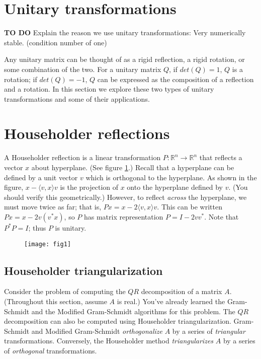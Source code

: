 \label{Ch:Canonical Transformations}


\section*{Unitary transformations}
{\bf TO DO} Explain the reason we use unitary transformations: Very numerically stable. (condition number of one)

Any unitary matrix can be thought of as a rigid reflection, a rigid rotation, or some combination of the two. For a unitary matrix $Q$, if $det(Q) = 1$, $Q$ is a rotation; if $det(Q) = -1$, $Q$ can be expressed as the composition of a reflection and a rotation.  In this section we explore these two types of unitary transformations and some of their applications.

\section*{Householder reflections}
A Householder reflection is a linear transformation $P: \mathbb{R}^n \rightarrow \mathbb{R}^n$ that reflects a vector $x$ about hyperplane. (See figure \ref{fig:Householder reflector}.) Recall that a hyperplane can be defined by a unit vector $v$ which is orthogonal to the hyperplane. As shown in the figure, $x - \langle v,x \rangle v$ is the projection of $x$ onto the hyperplane defined by $v$. (You should verify this geometrically.) However, to reflect \emph{across} the hyperplane, we must move twice as far; that is, $Px = x - 2\langle v,x \rangle v$. This can be written $Px = x - 2v(v^\ast x)$, so $P$ has matrix representation $P = I - 2vv^\ast$. Note that $P^\ast P = I$; thus $P$ is unitary.

\begin{figure}
\label{fig:Householder reflector}
	\texttt{[image: fig1]}
\end{figure}

\subsection*{Householder triangularization}
Consider the problem of computing the $QR$ decomposition of a matrix $A$. (Throughout this section, assume $A$ is real.) You've already learned the Gram-Schmidt and the Modified Gram-Schmidt algorithms for this problem. The $QR$ decomposition can also be computed using Householder triangularization. Gram-Schmidt and Modified Gram-Schmidt \emph{orthogonalize} $A$ by a series of \emph{triangular} transformations. Conversely, the Householder method \emph{triangularizes} $A$ by a series of \emph{orthogonal} transformations.

